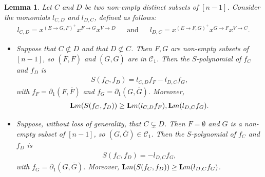 \documentclass[10pt]{amsart}
\newcommand{\lm}{\mbox{${\bf L}{\rm m}$}}
\newcommand{\mcc}{\mbox{$\mathcal{C}$}}
\newcommand{\dif}{\mbox{$\partial$}}
\newtheorem{lemma}[cdrthm]{Lemma}
\theoremstyle{definition}
\theoremstyle{remark}
\begin{document}
\begin{lemma}\label{s-poly}
Let $C$ and $D$ be two non-empty distinct subsets of $[n-1]$. Consider
the monomials $l_{C,D}$ and $l_{D,C}$, defined as follows:
\begin{eqnarray*}
l_{C,D}=x^{(E\to G,F)^{+}}x^{F\to G}x^{V\to D}\phantom{+}\mbox{ and }\phantom{+}
l_{D,C}=x^{(E\to F,G)^{+}}x^{G\to F}x^{V\to C}.
\end{eqnarray*}
\begin{itemize}
\item[$(a)$] Suppose that $C\not\subset D$ and that $D\not\subset
  C$. Then $F,G$ are non-empty subsets of $[n-1]$, so
  $(F,\overline{F})$ and $(G,\overline{G})$ are in $\mcc_1$. Then the
  $S$-polynomial of $f_C$ and $f_D$ is
\begin{eqnarray}\label{sfcfd}
S(f_C,f_D)=l_{C,D}f_F-l_{D,C}f_G,
\end{eqnarray}
with $f_F=\dif_1(F,\overline{F})$ and
$f_G=\dif_1(G,\overline{G})$. Moreover,
\begin{eqnarray*}
\lm(S(f_C,f_D))\geq\lm(l_{C,D}f_F),\lm(l_{D,C}f_G).
\end{eqnarray*}
\item[$(b)$] Suppose, without loss of generality, that $C\subsetneq
  D$. Then $F=\emptyset$ and $G$ is a non-empty subset of $[n-1]$, so
  $(G,\overline{G})\in\mcc_1$. Then the $S$-polynomial of $f_C$ and
  $f_D$ is
\begin{eqnarray}\label{sfcfd0}
S(f_C,f_D)=-l_{D,C}f_G, 
\end{eqnarray}
with $f_G=\dif_1(G,\overline{G})$.  Moreover,
$\lm(S(f_C,f_D))\geq\lm(l_{D,C}f_G)$.
\end{itemize}
\end{lemma}
\end{document}
